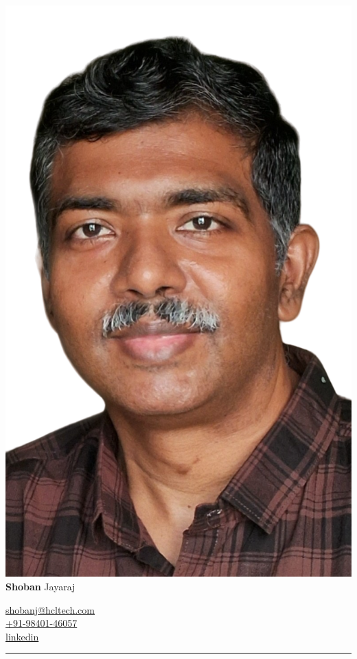 \documentclass[a4paper,12pt]{article}
\newcommand\cvtitle[2]{\Huge{\bf{#1}} \Huge{#2}}
\newcommand\cvcontact[3] {
  \small {
    \href{mailto:#1}{\faAt \quad #1} \\
    \href{tel:#2}{\faPhone \quad #2} \\
    {\href{https://www.linkedin.com/in/#3/}{\faLinkedin \quad linkedin}}
  }
}
\newcommand\cvhrule{{\color{gray}\hrule}}
\begin{document}
\begin{minipage}[b]{.69\linewidth}
  \includegraphics[height=3\baselineskip]{me}
  \cvtitle{Shoban}{Jayaraj}
\end{minipage}
\begin{minipage}[b]{.3\linewidth}
  \cvcontact{shobanj@hcltech.com}{+91-98401-46057}{shobanj}
\end{minipage}

\cvhrule
\end{document}
